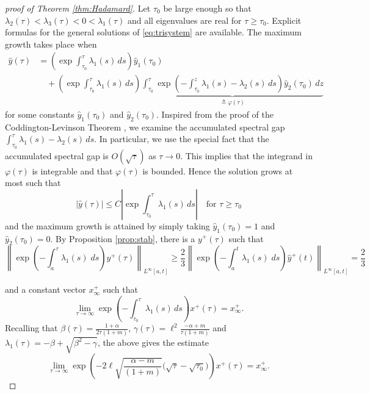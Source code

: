 \documentclass[a4paper,11pt]{article}
\def\l{{\ell}}
\theoremstyle{remark}
\begin{document}
\begin{proof}[proof of Theorem \ref{thm:Hadamard}]
Let $\tau_0$ be large enough so that $\lambda_2(\tau) < \lambda_3(\tau) < 0 < \lambda_1(\tau)$ and all eigenvalues are real for $\tau\ge \tau_0$. Explicit formulas for the general solutions of \eqref{eq:trisystem} are available. The maximum growth  takes place when
$$
\begin{aligned}
 \hat{y}(\tau) &=\left(\exp{\int_{\tau_0}^\tau \lambda_1(s)\, ds} \right)\hat y_1(\tau_0)
 \\
 &\quad +  \left(\exp{\int_{\tau_0}^\tau \lambda_1(s)\, ds}\right) \underbrace{\int_{\tau_0}^\tau \exp{\left(-\int_{\tau_0}^z \lambda_1(s)-\lambda_2(s)\,ds\right)}\hat y_2(\tau_0) \, dz}_{\triangleq \varphi(\tau)}
\end{aligned}
$$
for some constants $\hat{y}_1(\tau_0)$ and $\hat{y}_2(\tau_0)$. Inspired from the proof of the Coddington-Levinson Theorem \cite{CL55}, we examine the accumulated spectral gap $\int_{\tau_0}^\tau \lambda_1(s)-\lambda_2(s)\,ds$. In particular, we use the special fact that the accumulated spectral gap is ${O}(\sqrt{\tau})$ as $\tau \rightarrow 0$. This implies that the integrand in $\varphi(\tau)$ is integrable and that $\varphi(\tau)$ is bounded. Hence the solution grows at most such that
$$|\hat{y}(\tau)|\le C \left| \exp{\int_{\tau_0}^\tau \lambda_1(s)\, ds}\right| \quad \text{for }\tau\ge\tau_0$$
and the maximum growth is attained by simply taking $\hat{y}_1(\tau_0)=1$ and $\hat{y}_2(\tau_0)=0$. By Proposition \ref{prop:stab}, there is a $y^+(\tau)$ such that
$$ \left\|\exp\left(-\int_a^\tau \lambda_1(s)\; ds\right)y^+(\tau)\right\|_{L^\infty[a,t]} \ge \frac{2}{3}\left\|\exp\left(-\int_a^t \lambda_1(s)\; ds\right)\hat{y}^+(t)\right\|_{L^\infty[a,t]} =  \frac{2}{3}$$


and a constant vector $x^+_\infty$ such that
\begin{equation*}
  \lim_{\tau \rightarrow \infty}\exp{\left(-\int_{\tau_0}^\tau \lambda_1(s)\, ds\right)} x^+(\tau) = x^+_\infty.
\end{equation*}
Recalling that $\beta(\tau) = \frac{1+\alpha}{2\tau(1+m)}$, $\gamma(\tau)= \l^2\frac{-\alpha+m}{\tau(1+m)}$ and $\lambda_1(\tau) = -\beta + \sqrt{\beta^2-\gamma}$, the above gives the estimate
\begin{equation}
  \lim_{\tau \rightarrow \infty}\exp{\left(-2\l\sqrt{\frac{\alpha-m}{(1+m)}}\big(\sqrt{\tau}-\sqrt{\tau_0}\big)\right)} x^+(\tau) = x^+_\infty.
\end{equation}
\end{proof}
\end{document}
